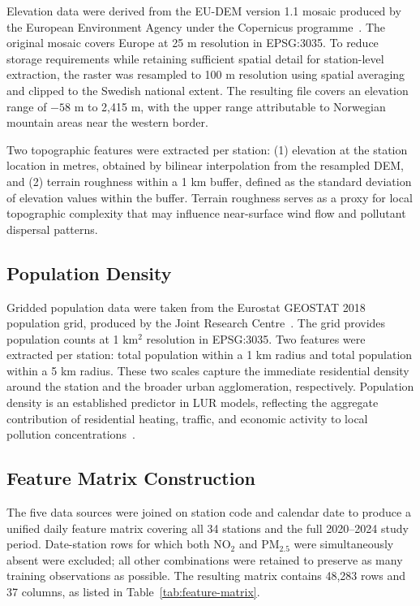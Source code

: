 \documentclass[11pt,a4paper]{article}
\let\oldsubsection\subsection
\renewcommand{\subsection}{\FloatBarrier\oldsubsection}
\begin{document}
Elevation data were derived from the EU-DEM version 1.1 mosaic produced by the European Environment Agency under the Copernicus programme~\cite{eudem_v11}.
The original mosaic covers Europe at 25 m resolution in EPSG:3035. To reduce storage requirements while retaining sufficient spatial detail for station-level extraction, the raster was resampled to 100 m resolution using spatial averaging and clipped to the Swedish national extent. The resulting file covers an elevation range of $-58$ m to 2,415 m, with the upper range attributable to Norwegian mountain areas near the western border.

Two topographic features were extracted per station: (1) elevation at the station location in metres, obtained by bilinear interpolation from the resampled DEM, and (2) terrain roughness within a 1 km buffer, defined as the standard deviation of elevation values within the buffer. Terrain roughness serves as a proxy for local topographic complexity that may influence near-surface wind flow and pollutant dispersal patterns.

\subsection{Population Density}
\label{sec:data-population}

Gridded population data were taken from the Eurostat GEOSTAT 2018 population grid, produced by the Joint Research Centre~\cite{jrc_geostat_2018}.
The grid provides population counts at 1 km$^2$ resolution in EPSG:3035. Two features were extracted per station: total population within a 1 km radius and total population within a 5 km radius. These two scales capture the immediate residential density around the station and the broader urban agglomeration, respectively. Population density is an established predictor in LUR models, reflecting the aggregate contribution of residential heating, traffic, and economic activity to local pollution concentrations~\cite{hoek_lur_review_2008}.

\subsection{Feature Matrix Construction}
\label{sec:data-matrix}

The five data sources were joined on station code and calendar date to produce a unified daily feature matrix covering all 34 stations and the full 2020--2024 study period. Date-station rows for which both NO$_2$ and PM$_{2.5}$ were simultaneously absent were excluded; all other combinations were retained to preserve as many training observations as possible. The resulting matrix contains 48,283 rows and 37 columns, as listed in Table~\ref{tab:feature-matrix}.
\end{document}
